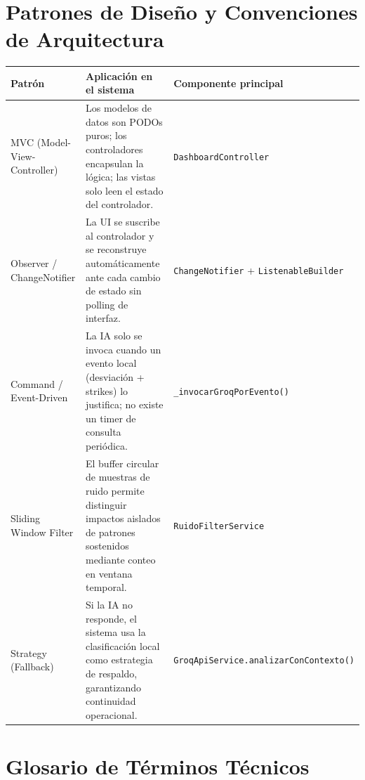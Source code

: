 \documentclass[12pt,a4paper]{article}
\begin{document}
\section{Patrones de Diseño y Convenciones de Arquitectura}

\begin{center}
\begin{tabularx}{0.95\textwidth}{lXl}
    \toprule
    \textbf{Patrón} & \textbf{Aplicación en el sistema} & \textbf{Componente principal} \\
    \midrule
    MVC (Model-View-Controller) &
        Los modelos de datos son PODOs puros; los controladores encapsulan la lógica; las vistas solo leen el estado del controlador. &
        \texttt{DashboardController} \\
    \addlinespace
    Observer / ChangeNotifier &
        La UI se suscribe al controlador y se reconstruye automáticamente ante cada cambio de estado sin polling de interfaz. &
        \texttt{ChangeNotifier} + \texttt{ListenableBuilder} \\
    \addlinespace
    Command / Event-Driven &
        La IA solo se invoca cuando un evento local (desviación + strikes) lo justifica; no existe un timer de consulta periódica. &
        \texttt{\_invocarGroqPorEvento()} \\
    \addlinespace
    Sliding Window Filter &
        El buffer circular de muestras de ruido permite distinguir impactos aislados de patrones sostenidos mediante conteo en ventana temporal. &
        \texttt{RuidoFilterService} \\
    \addlinespace
    Strategy (Fallback) &
        Si la IA no responde, el sistema usa la clasificación local como estrategia de respaldo, garantizando continuidad operacional. &
        \texttt{GroqApiService.analizarConContexto()} \\
    \bottomrule
\end{tabularx}
\end{center}

\section{Glosario de Términos Técnicos}
\end{document}
